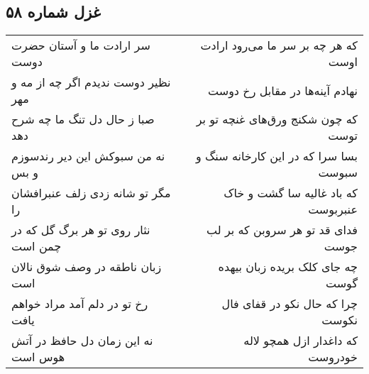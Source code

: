 \begin{center}
\section*{غزل شماره ۵۸}
\label{sec:sh058}
\begin{longtable}{l p{0.5cm} r}
سر ارادت ما و آستان حضرت دوست
&&
که هر چه بر سر ما می‌رود ارادت اوست
\\
نظیر دوست ندیدم اگر چه از مه و مهر
&&
نهادم آینه‌ها در مقابل رخ دوست
\\
صبا ز حال دل تنگ ما چه شرح دهد
&&
که چون شکنج ورق‌های غنچه تو بر توست
\\
نه من سبوکش این دیر رندسوزم و بس
&&
بسا سرا که در این کارخانه سنگ و سبوست
\\
مگر تو شانه زدی زلف عنبرافشان را
&&
که باد غالیه سا گشت و خاک عنبربوست
\\
نثار روی تو هر برگ گل که در چمن است
&&
فدای قد تو هر سروبن که بر لب جوست
\\
زبان ناطقه در وصف شوق نالان است
&&
چه جای کلک بریده زبان بیهده گوست
\\
رخ تو در دلم آمد مراد خواهم یافت
&&
چرا که حال نکو در قفای فال نکوست
\\
نه این زمان دل حافظ در آتش هوس است
&&
که داغدار ازل همچو لاله خودروست
\\
\end{longtable}
\end{center}
